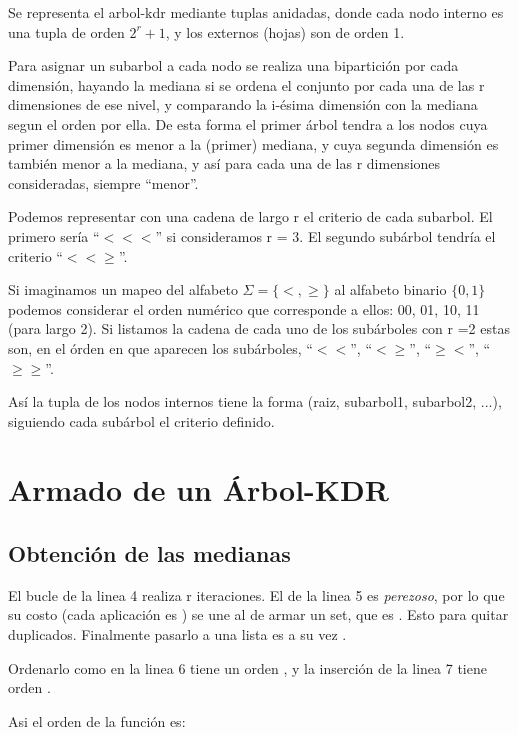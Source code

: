 Se representa el arbol-kdr mediante tuplas anidadas, donde cada
nodo interno es una tupla de orden $2^r + 1$, y los externos (hojas)
son de orden 1.

Para asignar un subarbol a cada nodo se realiza una bipartición por
cada dimensión, hayando la mediana si se ordena el conjunto por cada
una de las r dimensiones de ese nivel, y comparando la i-ésima
dimensión con la mediana segun el orden por ella.
De esta forma el primer árbol tendra a los nodos cuya primer
dimensión es menor a la (primer) mediana, y cuya segunda dimensión
es también menor a la mediana, y así para cada una de las r
dimensiones consideradas, siempre ``menor''.

Podemos representar con una cadena de largo r el
criterio de cada subarbol. El primero sería ``$<<<$'' si consideramos
r = 3. El segundo subárbol tendría el criterio ``$<<\geq$''.

Si imaginamos un mapeo del alfabeto $\Sigma = \{ <, \geq \}$ al
alfabeto binario $\{ 0, 1 \}$ podemos considerar el orden numérico
que corresponde a ellos: 00, 01, 10, 11 (para largo 2).
Si
listamos la cadena de cada uno de los subárboles con r =2 estas son,
en el órden en que aparecen los subárboles, ``$<<$'', ``$<\geq$'',
``$\geq<$'', ``$\geq\geq$''.

Así la tupla de los nodos internos tiene la forma (raiz, subarbol1,
subarbol2, ...), siguiendo cada subárbol el criterio definido.



\section{Armado de un Árbol-KDR}
\subsection{Obtención de las medianas}


El bucle de la linea 4 realiza r iteraciones. El  de la linea 5 es
\emph{perezoso}, por lo que su costo (cada aplicación es ) se une al de
armar un set, que es . Esto para quitar duplicados.
Finalmente pasarlo a una lista es a su vez .

Ordenarlo como en la linea 6 tiene un orden , y la inserción de
la linea 7 tiene orden .

Asi el orden de la función  es:

